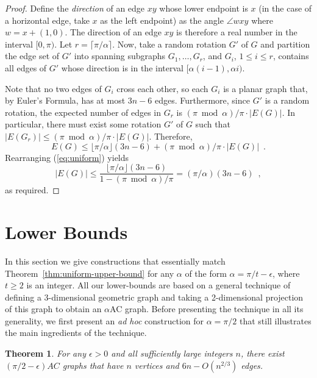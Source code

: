 \documentclass{patmorin}
\newcommand{\seclabel}[1]{\label{sec:#1}}
\newcommand{\eqlabel}[1]{\label{eq:#1}}
\newcommand{\eqref}[1]{(\ref{eq:#1})}
\newtheorem{thm}{Theorem}
\newcommand{\thmref}[1]{Theorem~\ref{thm:#1}}
\begin{document}
\begin{proof}
Define the \emph{direction} of an edge $xy$ whose lower endpoint is $x$ (in
the case of a horizontal edge, take $x$ as the left endpoint) as the angle 
$\angle wxy$ where $w=x+(1,0)$. The direction of an edge $xy$ is
therefore a real number in the interval $[0,\pi)$. Let $r=\lceil\pi/\alpha\rceil$. 
Now, take a random rotation $G'$ of $G$ and partition the edge set of $G'$ 
into spanning subgraphs $G_1,\ldots, G_{r}$, and $G_i$, $1\leq i\leq r$,
contains all edges of $G'$ whose direction is in the interval $[\alpha(i-1),\alpha i)$.

Note that no two edges of $G_i$ cross each other, so each $G_i$ is
a planar graph that, by Euler's Formula, has at most $3n-6$ edges.
Furthermore, since $G'$ is a random rotation, the expected number of
edges in $G_{r}$ is $(\pi\bmod \alpha)/\pi \cdot |E(G)|$.
In particular, there must exist some rotation $G'$ of $G$ such that $|E(G_r)| \le (\pi\bmod \alpha)/\pi \cdot |E(G)|$.
Therefore,
\begin{equation}
   E(G) \le \lfloor \pi/\alpha \rfloor(3n-6) + (\pi\bmod\alpha)/\pi \cdot|E(G)| \enspace .
   \eqlabel{uniform}
\end{equation}
Rearranging \eqref{uniform} yields
\[
  |E(G)|
    \le  \frac{\lfloor \pi/\alpha \rfloor(3n-6)}{1-(\pi\bmod\alpha)/\pi}
    = (\pi/\alpha)(3n-6) \enspace ,
\]
as required.
\end{proof}



\section{Lower Bounds}
\seclabel{lower-bounds}

In this section we give constructions that essentially match
\thmref{uniform-upper-bound} for any $\alpha$ of the form
$\alpha=\pi/t-\epsilon$, where $t\ge 2$ is an integer.  All our
lower-bounds are based on a general technique of defining a 3-dimensional
geometric graph and taking a 2-dimensional projection of this graph
to obtain an $\alpha$AC graph.  Before presenting the technique in
all its generality, we first present an \emph{ad hoc} construction
for $\alpha=\pi/2$ that still illustrates the main ingredients of the
technique.

\begin{thm} \label{thm:LB_thm2}
For any $\epsilon > 0$ and all sufficiently large integers $n$, there exist
$(\pi/2-\epsilon)AC$ graphs that have $n$ vertices and $6n- O(n^{2/3})$ edges.
\end{thm}
\end{document}
